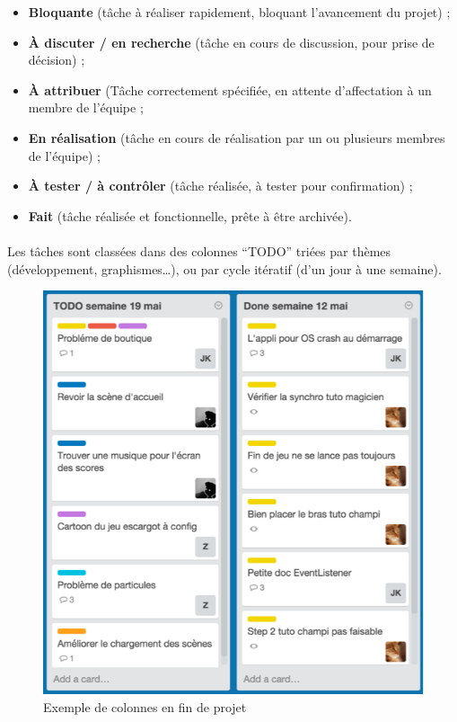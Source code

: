 \begin{itemize}
\item \textbf{Bloquante} (tâche à réaliser rapidement, bloquant l’avancement du projet) ;
\item \textbf{À discuter / en recherche} (tâche en cours de discussion, pour prise de décision) ;
\item \textbf{À attribuer} (Tâche correctement spécifiée, en attente d’affectation à un membre de l’équipe ;
\item \textbf{En réalisation} (tâche en cours de réalisation par un ou plusieurs membres de l’équipe) ;
\item \textbf{À tester / à contrôler} (tâche réalisée, à tester pour confirmation) ;
\item \textbf{Fait} (tâche réalisée et fonctionnelle, prête à être archivée).
\end{itemize}
 
\paragraph{}
Les tâches sont classées dans des colonnes “TODO” triées par thèmes (développement, graphismes…), ou par cycle itératif (d’un jour à une semaine).
 
\begin{figure}[H]\centering
  \includegraphics[scale=1]{./img/trello.png}
  \caption{Exemple de colonnes en fin de projet}
  \label{trelloc}
\end{figure}
 
